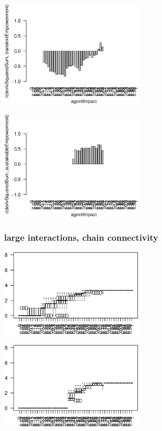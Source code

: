 \documentclass[conference]{IEEEtran}
\begin{document}
\centerline{\includegraphics[width=7cm]{n08_chain_small_corr_dss_emp.eps}}

\centerline{\includegraphics[width=7cm]{n08_chain_small_corr_dss_empsust.eps}}


\pagebreak


\subsubsection{large interactions, chain connectivity}

\rule{0pt}{0pt}

\centerline{\includegraphics[width=7cm]{n08_chain_large_emp.eps}}

\centerline{\includegraphics[width=7cm]{n08_chain_large_empsust.eps}}
\end{document}

